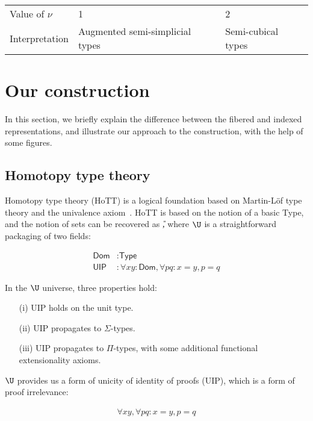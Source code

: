 \documentclass[10pt]{art.cls/art}
\newcommand{\Type}{\textsf{Type}}
\newcommand{\Dom}{\textsf{Dom}}
\newcommand{\UIP}{\textsf{UIP}}
\def\graymidrule{\arrayrulecolor{gray30}\midrule\arrayrulecolor{gray65}}
\begin{document}
\begin{table}[H]
  \begin{tabularx}{\linewidth}{p{.2\linewidth}|p{.4\linewidth}|p{.3\linewidth}}
    \toprule
    Value of $\nu$ & 1                               & 2                  \\
    \graymidrule
    Interpretation & Augmented semi-simplicial types & Semi-cubical types \\
    \bottomrule
  \end{tabularx}
\end{table}

\section{Our construction}
In this section, we briefly explain the difference between the fibered and indexed representations, and illustrate our approach to the construction, with the help of some figures.

\subsection{Homotopy type theory}
Homotopy type theory (HoTT) is a logical foundation based on Martin-Löf type theory and the univalence axiom~\cite{hottbook}. HoTT is based on the notion of a basic Type, and the notion of sets can be recovered as \U, where $\U$ is a straightforward packaging of two fields:

\begin{align*}
  \Dom & : \Type                                          \\
  \UIP & : \forall x y : \Dom, \forall p q : x = y, p = q
\end{align*}

In the $\U$ universe, three properties hold:

\begin{enumerate}
  \item[(i)] UIP holds on the unit type.
  \item[(ii)] UIP propagates to $\Sigma$-types.
  \item[(iii)] UIP propagates to $\Pi$-types, with some additional functional extensionality axioms.
\end{enumerate}

$\U$ provides us a form of unicity of identity of proofs (UIP), which is a form of proof irrelevance:

\begin{align*}
  \forall x y, \forall p q : x = y, p = q
\end{align*}
\end{document}
